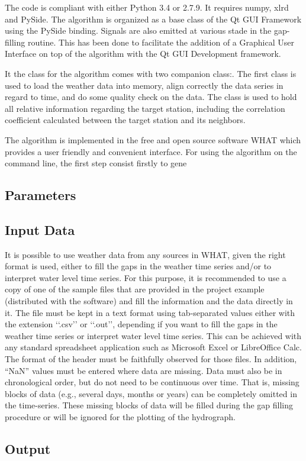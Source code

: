 \documentclass[TechnicalNoteMeteo.tex]{subfiles}
\begin{document}
The code is compliant with either Python 3.4 or 2.7.9. It requires numpy, xlrd and PySide. The algorithm is organized as a base class of the Qt GUI Framework using the PySide binding. Signals are also emitted at various stade in the gap-filling routine. This has been done to facilitate the addition of a Graphical User Interface on top of the algorithm with the Qt GUI Development framework.

It the class for the algorithm comes with two companion class:. The first class is used to load the weather data into memory, align correctly the data series in regard to time, and do some quality check on the data. The class is used to hold all relative information regarding the target station, including the correlation coefficient calculated between the target station and its neighbors.

The algorithm is implemented in the free and open source software WHAT which provides a user friendly and convenient interface. For using the algorithm on the command line, the first step consist firstly to gene

\subsection{Parameters}\label{sec:parameters}



\subsection{Input Data}

It is possible to use weather data from any sources in WHAT, given the right format is used, either to fill the gaps in the weather time series and/or to interpret water level time series. For this purpose, it is recommended to use a copy of one of the sample files that are provided in the project example (distributed with the software) and fill the information and the data directly in it. The file must be kept in a text format using tab-separated values either with the extension ‘‘.csv’’ or ‘‘.out’’, depending if you want to fill the gaps in the weather time series or  interpret water level time series. This can be achieved with any standard spreadsheet application such as Microsoft Excel or LibreOffice Calc. The format of the header must be faithfully observed for those files. In addition, ``NaN'' values must be entered where data are missing. Data must also be in chronological order, but do not need to be continuous over time. That is, missing blocks of data (e.g., several days, months or years) can be completely omitted in the time-series. These missing blocks of data will be filled during the gap filling procedure or will be ignored for the plotting of the hydrograph.

\subsection{Output}\label{sec:output}
\end{document}
